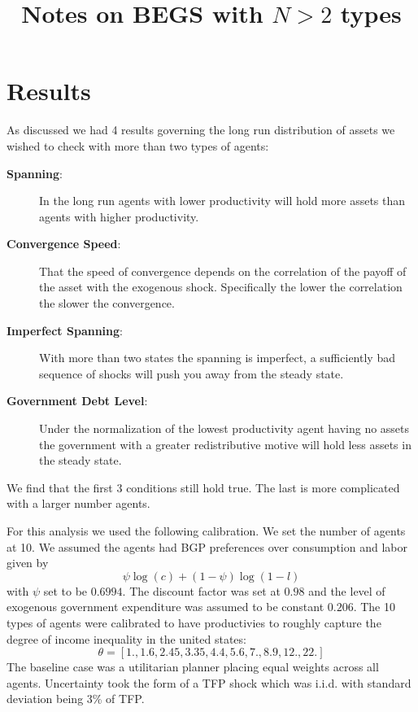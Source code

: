 \documentclass[thmsb,11pt]{article}
\begin{document}
\title{\textbf{ Notes on BEGS with $N>2$ types}}
\maketitle
\section{Results}
As discussed we had 4 results governing the long run distribution of assets we wished to check with more than two types of agents: 
\begin{description}
	\item[\textbf{Spanning}:]  In the long run agents with lower productivity will hold more assets than agents with higher productivity.
	\item[\textbf{Convergence Speed}:]  That the speed of convergence depends on the correlation of the payoff of the asset with the exogenous shock.  Specifically the lower the correlation the slower the convergence.
	\item[\textbf{Imperfect Spanning}:]  With more than two states the spanning is imperfect, a sufficiently bad sequence of shocks will push you away from the steady state.
	\item[\textbf{Government Debt Level}:]  Under the normalization of the lowest productivity agent having no assets the government with a greater redistributive motive will hold less assets in the steady state.
\end{description}  We find that the first 3 conditions still hold true.  The last is more complicated with a larger number agents.

For this analysis we used the following calibration.  We set the number of agents at 10.  We assumed the agents had BGP preferences over consumption and labor given by
\[
	\psi \log(c) + (1-\psi) \log(1-l)
\]with $\psi$ set to be $0.6994$.  The discount factor was set at $0.98$ and the level of exogenous government expenditure was assumed to be constant $0.206$.  The 10 types of agents were calibrated to have productivies to roughly capture the degree of income inequality in the united states:
\[
\theta =  [  1.  ,   1.6 ,   2.45,   3.35,   4.4 ,   5.6 ,   7.  ,   8.9 ,
        12.  ,  22.  ]
\]The baseline case was a utilitarian planner placing equal weights across all agents.  Uncertainty took the form of a TFP shock which was i.i.d. with standard deviation being 3\% of TFP.
\newpage
\end{document}
